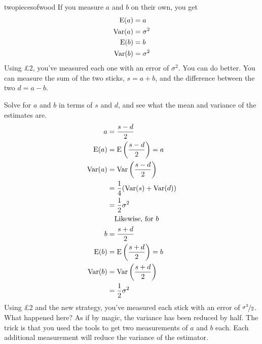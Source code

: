 \begin{answer}{twopiecesofwood}
If you measure $a$ and $b$ on their own, you get
\begin{align*}
\operatorname{\mathrm{E}}(a)   &= a \\
\operatorname{\mathrm{Var}}(a) &= \sigma^2 \\
\operatorname{\mathrm{E}}(b)   &= b \\
\operatorname{\mathrm{Var}}(b) &= \sigma^2
\end{align*}
Using \pounds 2, you've measured each one with an error of $\sigma^2$.
You can do better.
You can measure the sum of the two sticks, $s = a+b$, and the difference between the two $d = a-b$.
\begin{center}


\end{center}
Solve for $a$ and $b$ in terms of $s$ and $d$, and see what the mean and variance of the estimates are.
\begin{align*}
a   &= \frac{s - d}{2} \\
\operatorname{\mathrm{E}}(a)  &= \operatorname{\mathrm{E}}\left(\frac{s - d}{2}\right)
        =  a \\
\operatorname{\mathrm{Var}}(a) &= \operatorname{\mathrm{Var}}\left(\frac{s - d}{2} \right) \\
        &= \frac{1}{4}(\operatorname{\mathrm{Var}}(s) + \operatorname{\mathrm{Var}}(d)) \\
        &= \frac{1}{2}\sigma^2 \\
        & \quad \text{Likewise, for } b \\
b   &= \frac{s + d}{2} \\
\operatorname{\mathrm{E}}(b)  &= \operatorname{\mathrm{E}}\left(\frac{s + d}{2}\right)
        =  b \\
\operatorname{\mathrm{Var}}(b) &= \operatorname{\mathrm{Var}}\left(\frac{s + d}{2} \right) \\
        &= \frac{1}{2}\sigma^2
\end{align*}
Using \pounds 2 and the new strategy, you've measured each stick with an error of $\nicefrac{\sigma^2}{2}$.
What happened here? As if by magic, the variance has been reduced by half.
The trick is that you used the tools to get two measurements of $a$ and $b$ each.
Each additional measurement will reduce the variance of the estimator.
\end{answer}

